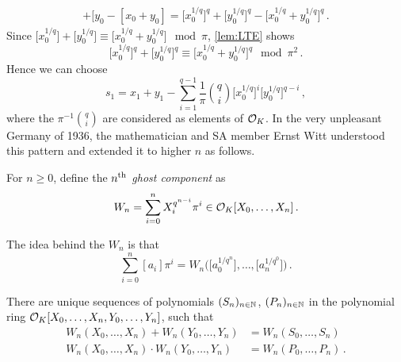 \documentclass[a4paper, 10pt, oneside, DIV=9, chapterprefix=true, numbers=enddot,bibliography=totoc]{scrbook}
\begin{document}
\begin{align*}
	[x_0]+[y_0-[x_0+y_0]=\big[x_0^{1/q}\big]^q+\big[y_0^{1/q}\big]^q-\big[x_0^{1/q}+y_0^{1/q}\big]^q\,.
\end{align*}
Since $\big[x_0^{1/q}\big]+\big[y_0^{1/q}\big]\equiv\big[x_0^{1/q}+y_0^{1/q}\big]\mod \pi$, \cref{lem:LTE} shows
\begin{equation*}
	\big[x_0^{1/q}\big]^q+\big[y_0^{1/q}\big]^q\equiv\big[x_0^{1/q}+y_0^{1/q}\big]^q\mod \pi^2\,.
\end{equation*}
Hence we can choose
\begin{equation*}
	s_1=x_1+y_1-\sum_{i=1}^{q-1}\frac{1}{\pi}\binom{q}{i}\big[x_0^{1/q}\big]^i\big[y_0^{1/q}\big]^{q-i}\,,
\end{equation*}
where the $\pi^{-1}\binom{q}{i}$ are considered as elements of $\mathcal{O}_K$. In the very unpleasant Germany of 1936, the mathematician and SA member Ernst Witt understood this pattern and extended it to higher $n$ as follows.
\begin{defi}
	For $n\geq 0$, define the \emph{$n^{\text{th}}$ ghost component} as
	\begin{equation*}
		W_n=\sum_{i=0}^{n}X_i^{q^{n-i}}\pi^i\in\mathcal{O}_K[X_0,\dotsc,X_n]\,.
	\end{equation*}
\end{defi}
\begin{urem}
The idea behind the $W_n$ is that 
\begin{equation*}
	\sum_{i=0}^n[a_i]\pi^i=W_n\Big(\big[a_0^{1/q^n}\big],\dotsc,\big[a_n^{1/q^0}\big]\Big)\,.
\end{equation*}
\end{urem}
\begin{prop}\label{prop:WittPolynomials}
	There are unique sequences of polynomials $(S_n)_{n\in \mathbb{N}}$, $(P_n)_{n\in\mathbb{N}}$ in the polynomial ring $\mathcal{O}_K[X_0,\ldots,X_n,Y_0,\ldots,Y_n]$, such that
	\begin{align*}
		W_n(X_0,\dotsc,X_n)+W_n(Y_0,\dotsc,Y_n)&=W_n(S_0,\dotsc,S_n)\\
		W_n(X_0,\dotsc,X_n)\cdot W_n(Y_0,\dotsc,Y_n)&=W_n(P_0,\dotsc,P_n)\,.
	\end{align*}
\end{prop}
\end{document}
